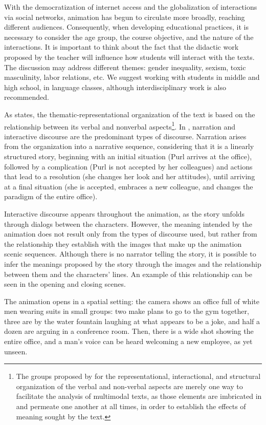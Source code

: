 \documentclass[english]{textolivre}
\begin{document}
With the democratization of internet access and the globalization of interactions via social networks, animation has begun to circulate more broadly, reaching different audiences. Consequently, when developing educational practices, it is necessary to consider the age group, the course objective, and the nature of the interactions. It is important to think about the fact that the didactic work proposed by the teacher will influence how students will interact with the texts. The discussion may address different themes: gender inequality, sexism, toxic masculinity, labor relations, etc. We suggest working with students in middle and high school, in language classes, although interdisciplinary work is also recommended. 

As \textcite{leal2011organizaccao} states, the thematic-representational organization of the text is based on the relationship between its verbal and nonverbal aspects\footnote{The groups proposed by \textcite{leal2011organizaccao} for the representational, interactional, and structural organization of the verbal and non-verbal aspects are merely one way to facilitate the analysis of multimodal texts, as those elements are imbricated in and permeate one another at all times, in order to establish the effects of meaning sought by the text.}. In \textcite{purl}, narration and interactive discourse are the predominant types of discourse. Narration arises from the organization into a narrative sequence, considering that it is a linearly structured story, beginning with an initial situation (Purl arrives at the office), followed by a complication (Purl is not accepted by her colleagues) and actions that lead to a resolution (she changes her look and her attitudes), until arriving at a final situation (she is accepted, embraces a new colleague, and changes the paradigm of the entire office).

Interactive discourse appears throughout the animation, as the story unfolds through dialogs between the characters. However, the meaning intended by the animation does not result only from the types of discourse used, but rather from the relationship they establish with the images that make up the animation scenic sequences. Although there is no narrator telling the story, it is possible to infer the meanings proposed by the story through the images and the relationship between them and the characters’ lines. An example of this relationship can be seen in the opening and closing scenes.

The animation opens in a spatial setting: the camera shows an office full of white men wearing suits in small groups: two make plans to go to the gym together, three are by the water fountain laughing at what appears to be a joke, and half a dozen are arguing in a conference room. Then, there is a wide shot showing the entire office, and a man’s voice can be heard welcoming a new employee, as yet unseen. 
\end{document}
